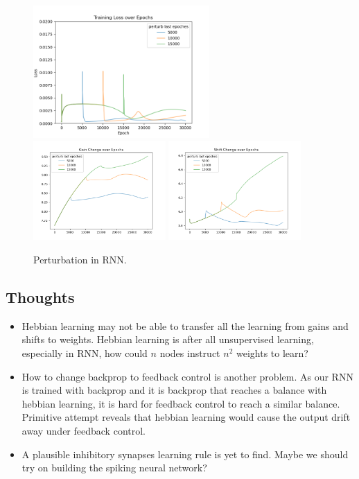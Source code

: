 \documentclass[12pt, a4paper]{article}
\begin{document}
\begin{figure}[H]
    \centering
    \includegraphics[width=0.6\textwidth]{RNN/ourRNN/analysis/fig/0122_SIN2_perturb_loss.png} \\
    \includegraphics[width=0.45\textwidth]{RNN/ourRNN/analysis/fig/0122_SIN2_perturb_gc.png} 
    \includegraphics[width=0.45\textwidth]{RNN/ourRNN/analysis/fig/0122_SIN2_perturb_sc.png}
    \caption{Perturbation in RNN.}
\end{figure}

\subsection*{Thoughts}

\begin{itemize}
    \item Hebbian learning may not be able to transfer all the learning from gains and shifts to weights. Hebbian learning is after all unsupervised learning, especially in RNN, how could $n$ nodes instruct $n^2$ weights to learn?
    \item How to change backprop to feedback control is another problem. As our RNN is trained with backprop and it is backprop that reaches a balance with hebbian learning, it is hard for feedback control to reach a similar balance. Primitive attempt reveals that hebbian learning would cause the output drift away under feedback control.
    \item A plausible inhibitory synapses learning rule is yet to find. Maybe we should try on building the spiking neural network?
\end{itemize}
\end{document}
